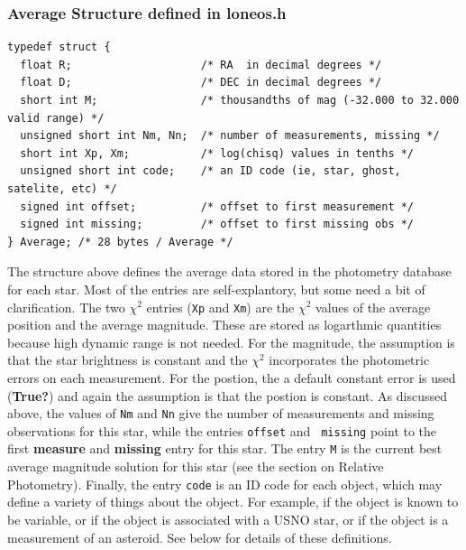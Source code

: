 \documentclass{article}
\newcommand{\note}[1]{({\bf #1})}
\begin{document}
\subsubsection*{Average Structure defined in loneos.h}
\begin{verbatim}
typedef struct {
  float R;                    /* RA  in decimal degrees */
  float D;                    /* DEC in decimal degrees */
  short int M;                /* thousandths of mag (-32.000 to 32.000 valid range) */
  unsigned short int Nm, Nn;  /* number of measurements, missing */
  short int Xp, Xm;           /* log(chisq) values in tenths */
  unsigned short int code;    /* an ID code (ie, star, ghost, satelite, etc) */
  signed int offset;          /* offset to first measurement */
  signed int missing;         /* offset to first missing obs */
} Average; /* 28 bytes / Average */
\end{verbatim}
The structure above defines the average data stored in the photometry
database for each star.  Most of the entries are self-explantory, but
some need a bit of clarification.  The two $\chi^2$ entries ({\tt Xp}
and {\tt Xm}) are the $\chi^2$ values of the average position and the
average magnitude.  These are stored as logarthmic quantities because
high dynamic range is not needed.  For the magnitude, the assumption
is that the star brightness is constant and the $\chi^2$ incorporates
the photometric errors on each measurement.  For the postion, the
a default constant error is used \note{True?} and again the assumption
is that the postion is constant.  As discussed above, the values of
{\tt Nm} and {\tt Nn} give the number of measurements and missing
observations for this star, while the entries {\tt offset} and {\tt
  missing} point to the first {\bf measure} and {\bf missing} entry
for this star.  The entry {\tt M} is the current best average
magnitude solution for this star (see the section on Relative
Photometry).  Finally, the entry {\tt code} is an ID code for each
object, which may define a variety of things about the object.  For
example, if the object is known to be variable, or if the object is
associated with a USNO star, or if the object is a measurement of an
asteroid.  See below for details of these definitions.
\end{document}
